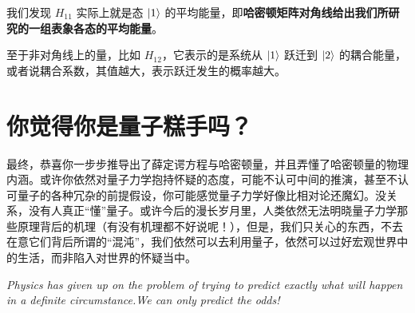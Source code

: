 \documentclass[12pt,a4paper,oneside]{book}
\begin{document}
我们发现 $H_{11}$ 实际上就是态 $\ket{1}$ 的平均能量，即\textbf{哈密顿矩阵对角线给出我们所研究的一组表象各态的平均能量}。

至于非对角线上的量，比如 $H_{12}$，它表示的是系统从 $\ket{1}$ 跃迁到 $\ket{2}$ 的耦合能量，或者说耦合系数，其值越大，表示跃迁发生的概率越大。

\section{你觉得你是量子糕手吗？}
最终，恭喜你一步步推导出了薛定谔方程与哈密顿量，并且弄懂了哈密顿量的物理内涵。或许你依然对量子力学抱持怀疑的态度，可能不认可中间的推演，甚至不认可量子的各种冗杂的前提假设，你可能感觉量子力学好像比相对论还魔幻。没关系，没有人真正“懂”量子。或许今后的漫长岁月里，人类依然无法明晓量子力学那些原理背后的机理（有没有机理都不好说呢！），但是，我们只关心的东西，不去在意它们背后所谓的“混沌”，我们依然可以去利用量子，依然可以过好宏观世界中的生活，而非陷入对世界的怀疑当中。

\textit{Physics has given up on the problem of trying to predict exactly what will happen in a definite circumstance.We can only predict the odds!}

\end{document}
